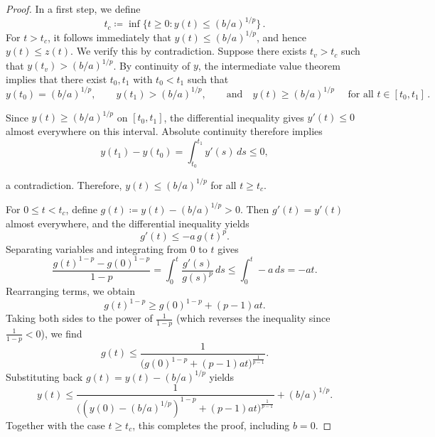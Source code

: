 \documentclass[10pt,a4paper]{amsart}
\begin{document}
    \begin{proof}
        In a first step, we define
        \begin{equation*}
            t_c \coloneqq \inf\{t \ge 0 : y(t) \le (b/a)^{1/p}\}\,.
        \end{equation*}
        For $t > t_c$, it follows immediately that $y(t) \le (b/a)^{1/p}$, and hence $y(t) \le z(t)$. We verify this by contradiction. Suppose there exists $t_v > t_c$ such that $y(t_v) > (b/a)^{1/p}$. By continuity of $y$, the intermediate value theorem implies that there exist $t_0, t_1$ with $t_0 < t_1$ such that
        \begin{equation*}
            y(t_0) = (b/a)^{1/p}, \qquad y(t_1) > (b/a)^{1/p}, \qquad \text{and} \quad y(t) \ge (b/a)^{1/p} \quad\text{ for all } t \in [t_0, t_1]\,.
        \end{equation*}
        
        Since $y(t)\geq(b/a)^{1/p}$ on $[t_0,t_1]$, the differential inequality gives $y'(t)\leq0$ almost everywhere on this interval. Absolute continuity therefore implies
        \begin{equation*}
            y(t_1)-y(t_0)=\int_{t_0}^{t_1}y'(s)\,ds\leq0,
        \end{equation*}
        
        a contradiction. Therefore, $y(t) \le (b/a)^{1/p}$ for all $t \ge t_c$.

        For $0 \le t < t_c$, define $g(t) \coloneqq y(t) - (b/a)^{1/p} > 0$. Then $g'(t) = y'(t)$ almost everywhere, and the differential inequality yields
        \begin{equation*}
            g'(t) \le -a\, g(t)^p.
        \end{equation*}
        Separating variables and integrating from $0$ to $t$ gives
        \begin{equation*}
            \frac{g(t)^{1 - p} - g(0)^{1 - p}}{1 - p} = \int_0^t \frac{g'(s)}{g(s)^p}\, ds \le \int_0^t -a\, ds = -a t.
        \end{equation*}
        Rearranging terms, we obtain
        \begin{equation*}
            g(t)^{1 - p} \ge g(0)^{1 - p} + (p - 1)a t.
        \end{equation*}
        Taking both sides to the power of $\tfrac{1}{1 - p}$ (which reverses the inequality since $\tfrac{1}{1 - p} < 0$), we find
        \begin{equation*}
            g(t) \le \frac{1}{\big(g(0)^{1 - p} + (p - 1)a t \big)^{\frac{1}{p - 1}}}.
        \end{equation*}
        Substituting back $g(t) = y(t) - (b/a)^{1/p}$ yields
        \begin{equation*}
            y(t) \le \frac{1}{\big((y(0) - (b/a)^{1/p})^{1 - p} + (p - 1)a t \big)^{\frac{1}{p - 1}}} + (b/a)^{1/p}.
        \end{equation*}
        Together with the case $t\geq t_c$, this completes the proof, including $b=0$.
    \end{proof}
\end{document}

